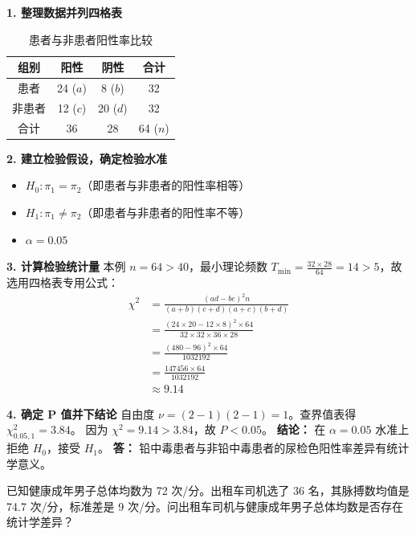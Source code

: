 \documentclass[lang=cn,10pt]{elegantbook}
\begin{document}
\begin{solution}
    \textbf{1. 整理数据并列四格表}

    \begin{table}[htbp]
        \centering
        \caption{患者与非患者阳性率比较}
        \begin{tabular}{cccc}
            \toprule
            组别 & 阳性 & 阴性 & 合计 \\
            \midrule
            患者   & 24 ($a$) & 8 ($b$)  & 32 \\
            非患者 & 12 ($c$) & 20 ($d$) & 32 \\
            \midrule
            合计   & 36       & 28       & 64 ($n$) \\
            \bottomrule
        \end{tabular}
    \end{table}

    \textbf{2. 建立检验假设，确定检验水准}
    \begin{itemize}
        \item $H_0: \pi_1 = \pi_2$（即患者与非患者的阳性率相等）
        \item $H_1: \pi_1 \neq \pi_2$（即患者与非患者的阳性率不等）
        \item $\alpha = 0.05$
    \end{itemize}

    \textbf{3. 计算检验统计量}
    本例 $n=64 > 40$，最小理论频数 $T_{\min} = \frac{32 \times 28}{64} = 14 > 5$，故选用四格表专用公式：
    \begin{align*}
        \chi^2 &= \frac{(ad-bc)^2 n}{(a+b)(c+d)(a+c)(b+d)} \\
               &= \frac{(24 \times 20 - 12 \times 8)^2 \times 64}{32 \times 32 \times 36 \times 28} \\
               &= \frac{(480 - 96)^2 \times 64}{1032192} \\
               &= \frac{147456 \times 64}{1032192} \\
               &\approx 9.14
    \end{align*}

    \textbf{4. 确定 P 值并下结论}
    自由度 $\nu = (2-1)(2-1) = 1$。查界值表得 $\chi^2_{0.05, 1} = 3.84$。
    因为 $\chi^2 = 9.14 > 3.84$，故 $P < 0.05$。
    \textbf{结论：} 在 $\alpha=0.05$ 水准上拒绝 $H_0$，接受 $H_1$。
    \textbf{答：} 铅中毒患者与非铅中毒患者的尿检色阳性率差异有统计学意义。
\end{solution}

\begin{exercise}
    已知健康成年男子总体均数为 72 次/分。出租车司机选了 36 名，其脉搏数均值是 74.7 次/分，标准差是 9 次/分。问出租车司机与健康成年男子总体均数是否存在统计学差异？
\end{exercise}
\end{document}
